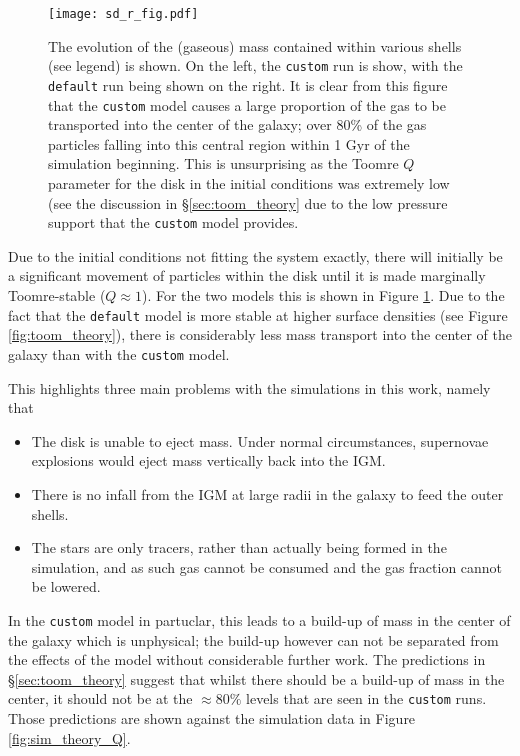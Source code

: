 \begin{figure}
    \centering
    \texttt{[image: sd\_r\_fig.pdf]}
    \caption{The evolution of the (gaseous) mass contained within various shells (see legend) is shown. On the left, the {\tt custom} run is show, with the {\tt default} run being shown on the right. It is clear from this figure that the {\tt custom} model causes a large proportion of the gas to be transported into the center of the galaxy; over 80\% of the gas particles falling into this central region within 1 Gyr of the simulation beginning. This is unsurprising as the Toomre $Q$ parameter for the disk in the initial conditions was extremely low (see the discussion in \S \ref{sec:toom_theory} due to the low pressure support that the {\tt custom} model provides.}
    \label{fig:sd_r_evo}
\end{figure}

Due to the initial conditions not fitting the system exactly, there will initially be a significant movement of particles within the disk until it is made marginally Toomre-stable ($Q\approx1$).
For the two models this is shown in Figure \ref{fig:sd_r_evo}.
Due to the fact that the {\tt default} model is more stable at higher surface densities (see Figure \ref{fig:toom_theory}), there is considerably less mass transport into the center of the galaxy than with the {\tt custom} model.

This highlights three main problems with the simulations in this work, namely that
\begin{itemize}
    \item The disk is unable to eject mass. Under normal circumstances, supernovae explosions would eject mass vertically back into the IGM.
    \item There is no infall from the IGM at large radii in the galaxy to feed the outer shells.
    \item The stars are only tracers, rather than actually being formed in the simulation, and as such gas cannot be consumed and the gas fraction cannot be lowered.
\end{itemize}
In the {\tt custom} model in partuclar, this leads to a build-up of mass in the center of the galaxy which is unphysical; the build-up however can not be separated from the effects of the model without considerable further work.
The predictions in \S \ref{sec:toom_theory} suggest that whilst there should be a build-up of mass in the center, it should not be at the $\approx 80\%$ levels that are seen in the {\tt custom} runs.
Those predictions are shown against the simulation data in Figure \ref{fig:sim_theory_Q}.

